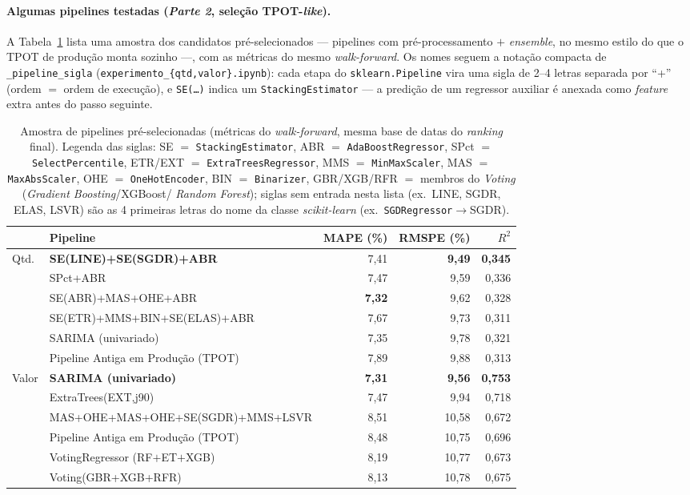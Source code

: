 \documentclass[11pt,a4paper]{article}
\begin{document}
\paragraph{Algumas pipelines testadas (\emph{Parte 2}, seleção TPOT-\emph{like}).} A Tabela~\ref{tab:pipelines}
lista uma amostra dos candidatos pré-selecionados --- pipelines com pré-processamento $+$
\emph{ensemble}, no mesmo estilo do que o TPOT de produção monta sozinho ---, com as métricas do
mesmo \emph{walk-forward}. Os nomes seguem a notação compacta de \texttt{\_pipeline\_sigla}
(\texttt{experimento\_\{qtd,valor\}.ipynb}): cada etapa do \texttt{sklearn.Pipeline} vira uma sigla
de 2--4 letras separada por ``+'' (ordem $=$ ordem de execução), e \texttt{SE(\dots)} indica um
\texttt{StackingEstimator} --- a predição de um regressor auxiliar é anexada como \emph{feature}
extra antes do passo seguinte.
\begin{table}[H]
\centering
\caption{Amostra de pipelines pré-selecionadas (métricas do \emph{walk-forward}, mesma base de
datas do \emph{ranking} final). Legenda das siglas: SE $=$ \texttt{StackingEstimator}, ABR $=$
\texttt{AdaBoostRegressor}, SPct $=$ \texttt{SelectPercentile},
ETR/EXT $=$ \texttt{ExtraTreesRegressor}, MMS $=$
\texttt{MinMaxScaler}, MAS $=$ \texttt{MaxAbsScaler}, OHE $=$ \texttt{OneHotEncoder}, BIN $=$
\texttt{Binarizer}, GBR/XGB/RFR $=$ membros do \emph{Voting} (\emph{Gradient Boosting}/XGBoost/
\emph{Random Forest}); siglas sem entrada nesta lista (ex.\ LINE, SGDR, ELAS, LSVR) são as 4
primeiras letras do nome da classe \emph{scikit-learn} (ex.\ \texttt{SGDRegressor}$\to$SGDR).}
\label{tab:pipelines}
\small
\begin{tabular}{@{}llrrr@{}}
\toprule
& \textbf{Pipeline} & \textbf{MAPE (\%)} & \textbf{RMSPE (\%)} & \textbf{$R^2$} \\
\midrule
\multirow{6}{*}{Qtd.}
& \textbf{SE(LINE)+SE(SGDR)+ABR}     & 7,41 & \textbf{9,49} & \textbf{0,345} \\
& SPct+ABR                           & 7,47 & 9,59 & 0,336 \\
& SE(ABR)+MAS+OHE+ABR                & \textbf{7,32} & 9,62 & 0,328 \\
& SE(ETR)+MMS+BIN+SE(ELAS)+ABR       & 7,67 & 9,73 & 0,311 \\
& SARIMA (univariado)                & 7,35 & 9,78 & 0,321 \\
& Pipeline Antiga em Produção (TPOT) & 7,89 & 9,88 & 0,313 \\
\midrule
\multirow{6}{*}{Valor}
& \textbf{SARIMA (univariado)}                & \textbf{7,31} & \textbf{9,56} & \textbf{0,753} \\
& ExtraTrees(EXT,j90)                          & 7,47 & 9,94 & 0,718 \\
& MAS+OHE+MAS+OHE+SE(SGDR)+MMS+LSVR            & 8,51 & 10,58 & 0,672 \\
& Pipeline Antiga em Produção (TPOT)           & 8,48 & 10,75 & 0,696 \\
& VotingRegressor (RF$+$ET$+$XGB)              & 8,19 & 10,77 & 0,673 \\
& Voting(GBR+XGB+RFR)                          & 8,13 & 10,78 & 0,675 \\
\bottomrule
\end{tabular}
\end{table}
\end{document}
